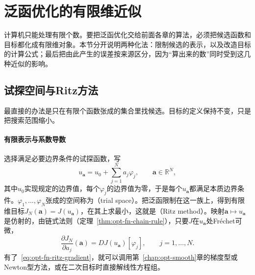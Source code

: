 
\section{泛函优化的有限维近似}
\label{sec:opt-fn-approximation}

计算机只能处理有限个数。要把泛函优化交给前面各章的算法，必须把候选函数和目标都化成有限维对象。本节分开说明两种化法：限制候选的表示，以及改造目标的计算公式；最后把由此产生的误差按来源区分，因为“算出来的数”同时受到这几种近似的影响。

\subsection{试探空间与Ritz方法}
\label{sec:opt-fn-ritz}

最直接的办法是只在有限个函数张成的集合里找候选。目标的定义保持不变，只是把搜索范围缩小。

\paragraph{有限表示与系数导数}
选择满足必要边界条件的试探函数，写
\[
 u_{\bm a}=u_0+\sum_{j=1}^Na_j\varphi_j,\qquad\bm a\in\mathbb R^N ,
\]
其中$u_0$实现规定的边界值，每个$\varphi_j$的边界值为零，于是每个$u_{\bm a}$都满足本质边界条件。$\varphi_1,\dots,\varphi_N$张成的空间称为（trial space）。把泛函限制在这一族上，得到有限维目标$J_N(\bm a)=J(u_{\bm a})$，在其上求最小，这就是（Ritz method）。映射$\bm a\mapsto u_{\bm a}$是仿射的，由链式法则（定理~\ref{thm:opt-fn-chain-rule}），只要$J$在$u_{\bm a}$处Fréchet可微，
\begin{equation}
 \frac{\partial J_N}{\partial a_j}(\bm a)=DJ(u_{\bm a})[\varphi_j],\qquad j=1,\dots,N .
 \label{eq:opt-fn-ritz-gradient}
\end{equation}
有了~\eqref{eq:opt-fn-ritz-gradient}，就可以调用第~\ref{chap:opt-smooth}章的梯度型或Newton型方法，或在二次目标时直接解线性方程组。

